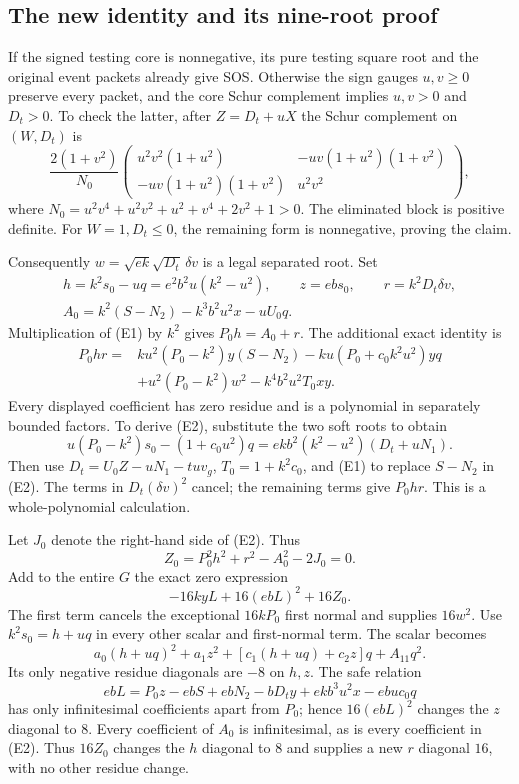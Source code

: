 \subsection{The new identity and its nine-root proof}
If the signed testing core is nonnegative, its pure testing square root and the original event packets already give SOS. Otherwise the sign gauges $u,v\ge0$ preserve every packet, and the core Schur complement implies $u,v>0$ and $D_t>0$. To check the latter, after $Z=D_t+uX$ the Schur complement on $(W,D_t)$ is
\[
\frac{2(1+v^2)}{N_0}
\begin{pmatrix}
u^2v^2(1+u^2)&-uv(1+u^2)(1+v^2)\\
-uv(1+u^2)(1+v^2)&u^2v^2
\end{pmatrix},
\]
where $N_0=u^2v^4+u^2v^2+u^2+v^4+2v^2+1>0$. The eliminated block is positive definite. For $W=1,D_t\le0$, the remaining form is nonnegative, proving the claim.

Consequently $w=\sqrt{ek}\sqrt{D_t}\,\delta v$ is a legal separated root. Set
\begin{gather*}
h=k^2s_0-uq=e^2b^2u(k^2-u^2),\qquad z=ebs_0,\qquad r=k^2D_t\delta v,\\
A_0=k^2(S-N_2)-k^3b^2u^2x-uU_0q.
\end{gather*}
Multiplication of (E1) by $k^2$ gives $P_0h=A_0+r$. The additional exact identity is
\begin{align*}
P_0hr={}&ku^2(P_0-k^2)y(S-N_2)
-ku(P_0+c_0k^2u^2)yq\\
&+u^2(P_0-k^2)w^2-k^4b^2u^2T_0xy. \tag{E2}
\end{align*}
Every displayed coefficient has zero residue and is a polynomial in separately bounded factors. To derive (E2), substitute the two soft roots to obtain
\[
u(P_0-k^2)s_0-(1+c_0u^2)q
=ekb^2(k^2-u^2)(D_t+uN_1).
\]
Then use $D_t=U_0Z-uN_1-tu v_g$, $T_0=1+k^2c_0$, and (E1) to replace $S-N_2$ in (E2). The terms in $D_t(\delta v)^2$ cancel; the remaining terms give $P_0hr$. This is a whole-polynomial calculation.

Let $J_0$ denote the right-hand side of (E2). Thus
\[
Z_0=P_0^2h^2+r^2-A_0^2-2J_0=0.
\]
Add to the entire $G$ the exact zero expression
\[
-16kyL+16(ebL)^2+16Z_0.
\]
The first term cancels the exceptional $16kP_0$ first normal and supplies $16w^2$. Use $k^2s_0=h+uq$ in every other scalar and first-normal term. The scalar becomes
\[
a_0(h+uq)^2+a_1z^2+[c_1(h+uq)+c_2z]q+A_{11}q^2.
\]
Its only negative residue diagonals are $-8$ on $h,z$. The safe relation
\[
ebL=P_0z-ebS+ebN_2-bD_ty+ekb^3u^2x-ebu c_0q
\]
has only infinitesimal coefficients apart from $P_0$; hence $16(ebL)^2$ changes the $z$ diagonal to $8$. Every coefficient of $A_0$ is infinitesimal, as is every coefficient in (E2). Thus $16Z_0$ changes the $h$ diagonal to $8$ and supplies a new $r$ diagonal $16$, with no other residue change.

